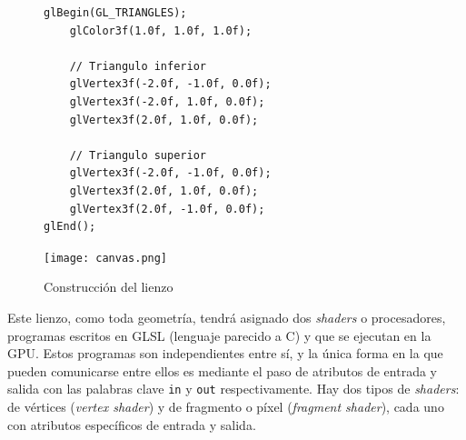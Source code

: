 \begin{figure}[ht]
    \centering
    \begin{minipage}{0.50\textwidth}
        \begin{lstlisting}
glBegin(GL_TRIANGLES);
    glColor3f(1.0f, 1.0f, 1.0f); 
    
    // Triangulo inferior
    glVertex3f(-2.0f, -1.0f, 0.0f);
    glVertex3f(-2.0f, 1.0f, 0.0f);
    glVertex3f(2.0f, 1.0f, 0.0f);
    
    // Triangulo superior
    glVertex3f(-2.0f, -1.0f, 0.0f);
    glVertex3f(2.0f, 1.0f, 0.0f);
    glVertex3f(2.0f, -1.0f, 0.0f);
glEnd();
\end{lstlisting}
    \end{minipage}%
    \hfill
    \begin{minipage}{0.40\textwidth}
        \texttt{[image: canvas.png]}
    \end{minipage}
    
    
    \caption{Construcción del lienzo}
    \label{fig:canvas}
\end{figure}


Este lienzo, como toda geometría, tendrá asignado dos \textit{shaders} o procesadores, programas escritos en GLSL (lenguaje parecido a C) y que se ejecutan en la GPU. Estos programas son independientes entre sí, y la única forma en la que pueden comunicarse entre ellos es mediante el paso de atributos de entrada y salida con las palabras clave \texttt{in} y \texttt{out} respectivamente. Hay dos tipos de \textit{shaders}: de vértices (\textit{vertex shader}) y de fragmento o píxel (\textit{fragment shader}), cada uno con atributos específicos de entrada y salida.\newline

